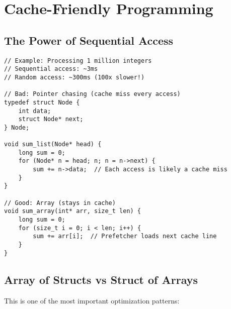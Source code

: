 \section{Cache-Friendly Programming}

\subsection{The Power of Sequential Access}

\begin{lstlisting}
// Example: Processing 1 million integers
// Sequential access: ~3ms
// Random access: ~300ms (100x slower!)

// Bad: Pointer chasing (cache miss every access)
typedef struct Node {
    int data;
    struct Node* next;
} Node;

void sum_list(Node* head) {
    long sum = 0;
    for (Node* n = head; n; n = n->next) {
        sum += n->data;  // Each access is likely a cache miss
    }
}

// Good: Array (stays in cache)
void sum_array(int* arr, size_t len) {
    long sum = 0;
    for (size_t i = 0; i < len; i++) {
        sum += arr[i];  // Prefetcher loads next cache line
    }
}
\end{lstlisting}

\subsection{Array of Structs vs Struct of Arrays}

This is one of the most important optimization patterns:

